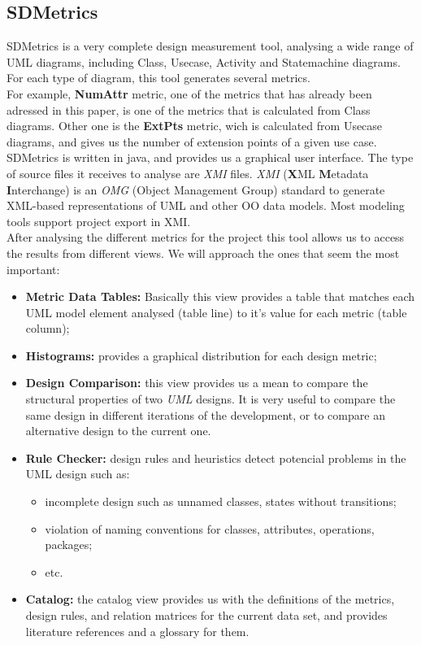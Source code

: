 \subsection{SDMetrics}
SDMetrics is a very complete design measurement tool, analysing a wide range of UML diagrams, including Class, Usecase, Activity and Statemachine diagrams. For each type of diagram, this tool generates several metrics.\\
For example, \textbf{NumAttr} metric, one of the metrics that has already been adressed in this paper, is one of the metrics that is calculated from Class diagrams. Other one is the \textbf{ExtPts} metric, wich is calculated from Usecase diagrams, and gives us the number of extension points of a given use case.\\
SDMetrics is written in java, and provides us a graphical user interface. The type of source files it receives to analyse are \textit{XMI} files. \textit{XMI} (\textbf{X}ML \textbf{M}etadata \textbf{I}nterchange)  is an \textit{OMG} (Object Management Group) standard to generate XML-based representations of UML and other OO data models. Most modeling tools support project export in XMI.\\
After analysing the different metrics for the project this tool allows us to access the results from different views. We will approach the ones that seem the most important:
\begin{itemize}
\item \textbf{Metric Data Tables:} Basically this view provides a table that matches each UML model element analysed (table line) to it's value for each metric (table column);
\item \textbf{Histograms:} provides a graphical distribution  for each design metric;
\item \textbf{Design Comparison:} this view provides us a mean to compare the structural properties of two \textit{UML} designs. It is very useful to compare the same design in different iterations of the development, or to compare an alternative design to the current one.
\item \textbf{Rule Checker:} design rules and heuristics detect potencial problems in the UML design such as: 
	\begin{itemize}
	\item incomplete design such as unnamed classes, states without transitions;
	\item violation of naming conventions for classes, attributes, operations, packages;
	\item etc.
	\end{itemize}
\item \textbf{Catalog:} the catalog view provides us with the definitions of the metrics, design rules, and relation matrices for the current data set, and provides literature references and a glossary for them.
\end{itemize}
